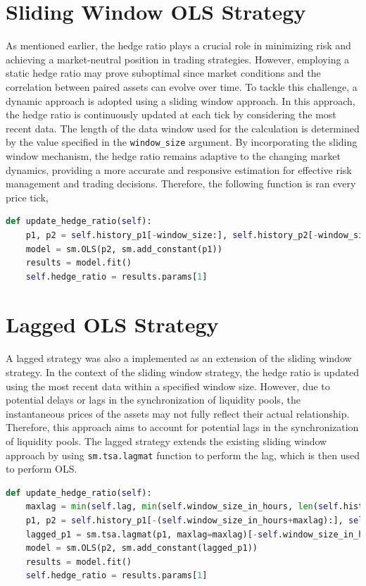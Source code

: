 \section{Sliding Window OLS Strategy}
As mentioned earlier, the hedge ratio plays a crucial role in minimizing risk and achieving a market-neutral position in trading strategies. However, employing a static hedge ratio may prove suboptimal since market conditions and the correlation between paired assets can evolve over time. To tackle this challenge, a dynamic approach is adopted using a sliding window approach. In this approach, the hedge ratio is continuously updated at each tick by considering the most recent data. The length of the data window used for the calculation is determined by the value specified in the \texttt{window\_size} argument. By incorporating the sliding window mechanism, the hedge ratio remains adaptive to the changing market dynamics, providing a more accurate and responsive estimation for effective risk management and trading decisions. Therefore, the following function is ran every price tick,
\begin{lstlisting}[language=Python]
def update_hedge_ratio(self):
    p1, p2 = self.history_p1[-window_size:], self.history_p2[-window_size:]
    model = sm.OLS(p2, sm.add_constant(p1))
    results = model.fit()
    self.hedge_ratio = results.params[1]
\end{lstlisting}

\section{Lagged OLS Strategy}
A lagged strategy was also a implemented as an extension of the sliding window strategy. In the context of the sliding window strategy, the hedge ratio is updated using the most recent data within a specified window size. However, due to potential delays or lags in the synchronization of liquidity pools, the instantaneous prices of the assets may not fully reflect their actual relationship. Therefore, this approach aims to account for potential lags in the synchronization of liquidity pools. The lagged strategy extends the existing sliding window approach by using \texttt{sm.tsa.lagmat} function to perform the lag, which is then used to perform OLS.
\begin{lstlisting}[language=Python]
def update_hedge_ratio(self):
    maxlag = min(self.lag, min(self.window_size_in_hours, len(self.history_p1))-1)
    p1, p2 = self.history_p1[-(self.window_size_in_hours+maxlag):], self.history_p2[-self.window_size_in_hours:]
    lagged_p1 = sm.tsa.lagmat(p1, maxlag=maxlag)[-self.window_size_in_hours:]
    model = sm.OLS(p2, sm.add_constant(lagged_p1))
    results = model.fit()
    self.hedge_ratio = results.params[1]
\end{lstlisting}

